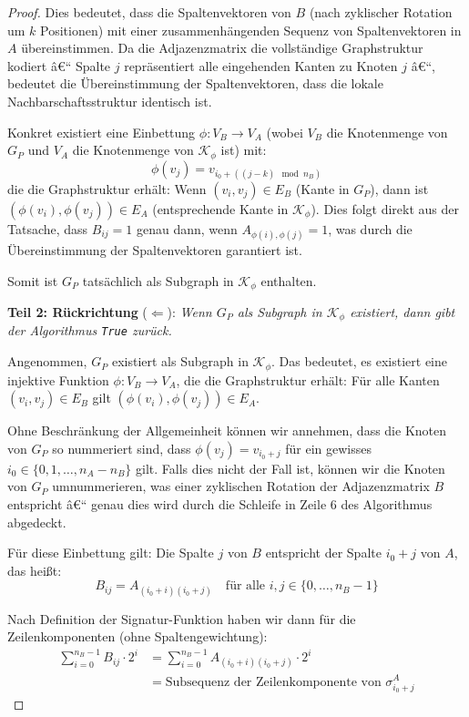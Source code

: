 ﻿\documentclass[a4paper,12pt]{article}
\theoremstyle{definition}
\begin{document}
\begin{proof}
Dies bedeutet, dass die Spaltenvektoren von $B$ (nach zyklischer Rotation um $k$ Positionen) mit einer zusammenhängenden Sequenz von Spaltenvektoren in $A$ übereinstimmen. Da die Adjazenzmatrix die vollständige Graphstruktur kodiert â€“ Spalte $j$ repräsentiert alle eingehenden Kanten zu Knoten $j$ â€“, bedeutet die Übereinstimmung der Spaltenvektoren, dass die lokale Nachbarschaftsstruktur identisch ist.

Konkret existiert eine Einbettung $\phi: V_B \to V_A$ (wobei $V_B$ die Knotenmenge von $G_P$ und $V_A$ die Knotenmenge von $\mathcal{K}_{\phi}$ ist) mit:
\begin{equation}
\phi(v_j) = v_{i_0 + ((j-k) \mod n_B)}
\end{equation}
die die Graphstruktur erhält: Wenn $(v_i, v_j) \in E_B$ (Kante in $G_P$), dann ist $(\phi(v_i), \phi(v_j)) \in E_A$ (entsprechende Kante in $\mathcal{K}_{\phi}$). Dies folgt direkt aus der Tatsache, dass $B_{ij} = 1$ genau dann, wenn $A_{\phi(i), \phi(j)} = 1$, was durch die Übereinstimmung der Spaltenvektoren garantiert ist.

Somit ist $G_P$ tatsächlich als Subgraph in $\mathcal{K}_{\phi}$ enthalten.

\textbf{Teil 2: Rückrichtung} ($\Leftarrow$): \textit{Wenn $G_P$ als Subgraph in $\mathcal{K}_{\phi}$ existiert, dann gibt der Algorithmus \texttt{True} zurück.}

Angenommen, $G_P$ existiert als Subgraph in $\mathcal{K}_{\phi}$. Das bedeutet, es existiert eine injektive Funktion $\phi: V_B \to V_A$, die die Graphstruktur erhält: Für alle Kanten $(v_i, v_j) \in E_B$ gilt $(\phi(v_i), \phi(v_j)) \in E_A$.

Ohne Beschränkung der Allgemeinheit können wir annehmen, dass die Knoten von $G_P$ so nummeriert sind, dass $\phi(v_j) = v_{i_0 + j}$ für ein gewisses $i_0 \in \{0, 1, \ldots, n_A - n_B\}$ gilt. Falls dies nicht der Fall ist, können wir die Knoten von $G_P$ umnummerieren, was einer zyklischen Rotation der Adjazenzmatrix $B$ entspricht â€“ genau dies wird durch die Schleife in Zeile 6 des Algorithmus abgedeckt.

Für diese Einbettung gilt: Die Spalte $j$ von $B$ entspricht der Spalte $i_0 + j$ von $A$, das heißt:
\begin{equation}
B_{ij} = A_{(i_0+i)(i_0+j)} \quad \text{für alle } i, j \in \{0, \ldots, n_B-1\}
\end{equation}

Nach Definition der Signatur-Funktion haben wir dann für die Zeilenkomponenten (ohne Spaltengewichtung):
\begin{align}
\sum_{i=0}^{n_B-1} B_{ij} \cdot 2^i &= \sum_{i=0}^{n_B-1} A_{(i_0+i)(i_0+j)} \cdot 2^i \\
&= \text{Subsequenz der Zeilenkomponente von } \sigma_{i_0+j}^A
\end{align}


\end{proof}
\end{document}
